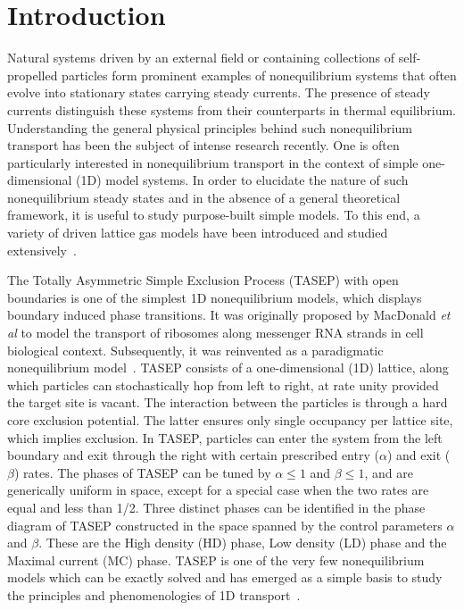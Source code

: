\documentclass[aps,pre,twocolumn,superscriptaddress,amsmath,amssymb,longbibliography,floatfix]{revtex4}
\begin{document}
\maketitle

\section{Introduction}



Natural systems driven by an external field or containing collections of self-propelled particles form prominent  examples of nonequilibrium systems that often
evolve into stationary states carrying steady currents. %
The presence of steady currents distinguish these systems  from their counterparts in thermal equilibrium.
Understanding the general physical principles behind such nonequilibrium transport has been the subject of
intense research recently. One is often particularly interested in nonequilibrium transport
in the context of simple one-dimensional (1D) model systems. In order to elucidate the nature of such nonequilibrium
steady states and in the absence of a general theoretical framework, it is useful to study purpose-built simple models. To this end, a variety of driven lattice gas models have been
introduced and studied extensively~\cite{basic}.

The Totally Asymmetric Simple Exclusion Process (TASEP) with open boundaries is one of the simplest 1D nonequilibrium models, which displays
 boundary induced phase transitions. It was originally
proposed by MacDonald {\em et al} \cite{mac}  to model
the transport of ribosomes along messenger RNA strands in cell biological context. Subsequently, it was reinvented as a paradigmatic nonequilibrium model~\cite{krug}. TASEP consists of a one-dimensional (1D) lattice, along which particles can stochastically hop
from left to right, at rate unity provided the target site is vacant.
The interaction between the particles is through a hard core exclusion potential. The latter ensures
only single occupancy per lattice site, which implies exclusion. In TASEP, particles can enter the system from the left boundary
and exit through the right with certain prescribed entry ($\alpha$) and exit ($\beta$) rates. The phases of TASEP can be tuned by
$\alpha \leq 1$ and $\beta \leq 1$, and are generically uniform in space, except for a special case when
the two rates are equal and less than 1/2. Three distinct phases can be identified in the
phase diagram of TASEP constructed in the space spanned by the control parameters $\alpha$ and $\beta$. 
These are the High density (HD) phase, Low density (LD) phase and the Maximal current (MC) phase.
 TASEP is one of the very few nonequilibrium models which
can be exactly solved and has emerged as a simple basis to study the principles and phenomenologies of 1D transport~\cite{privman,tasep-rev,phases,tasep}. 
\end{document}
